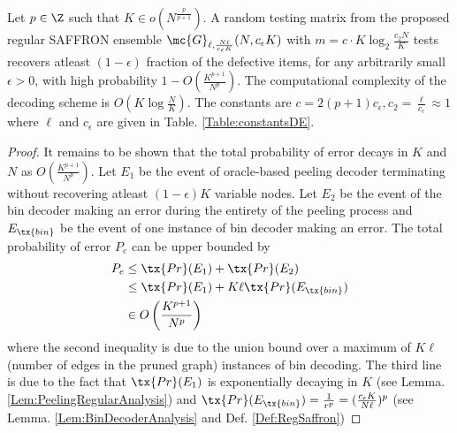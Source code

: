 \documentclass[conference,,twocolumn]{IEEEtran}
\def\ceps{c_{\epsilon}}
\begin{document}
\begin{theorem}
\label{Thm:NoiselessMain}
Let $p\in\Z$ such that $K\in o(N^{\frac{p}{p+1}})$. A random testing matrix from the proposed regular SAFFRON ensemble $\mc{G}_{\ell,\frac{N\ell}{\ceps K}}(N,\ceps K)$ with $m=c\cdot K\log_{2}\frac{c_2 N}{K}$ tests recovers atleast $(1-\epsilon)$ fraction of the defective items, for any arbitrarily small $\epsilon>0$, with high probability $1-O\left(\frac{K^{p+1}}{N^p}\right)$. The computational complexity of the decoding scheme is $O(K\log \frac{N}{K})$. The constants are $c=2(p+1)\ceps, c_2=\frac{\ell}{\ceps}\approx 1$ where $\ell$ and $\ceps$ are given in Table. \ref{Table:constantsDE}.
\end{theorem}
\begin{proof}
It remains to be shown that the total probability of error decays in $K$ and $N$ as $O\left(\frac{K^{p+1}}{N^p}\right)$. Let $E_1$ be the event of oracle-based peeling decoder terminating without recovering atleast $(1-\epsilon)K$ variable nodes. Let $E_2$ be the event of the bin decoder making an error during the entirety of the peeling process and $E_{\tx{bin}}$ be the event of one instance of bin decoder making an error. The total probability of error $P_e$ can be upper bounded by 
\begin{align*}
P_e &\leq \tx{Pr}(E_1)+ \tx{Pr}(E_2)\\
               &\leq \tx{Pr}(E_1)+ K\ell\tx{ Pr}(E_{\tx{bin}})\\
               &\in O\left(\frac{K^{p+1}}{N^p}\right)
\end{align*}
where the second inequality is due to the union bound over a maximum of $K\ell$ (number of edges in the pruned graph) instances of bin decoding. The third line is due to the fact that $\tx{Pr}(E_1)$ is exponentially decaying in $K$ (see Lemma. \ref{Lem:PeelingRegularAnalysis}) and $\tx{Pr}(E_{\tx{bin}})=\frac{1}{r^p}=(\frac{\ceps K}{N\ell})^p$ (see Lemma. \ref{Lem:BinDecoderAnalysis} and Def. \ref{Def:RegSaffron})
\end{proof}
\end{document}

